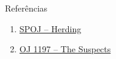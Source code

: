\begin{frame}[fragile]{Referências}

    \begin{enumerate}
        \item \href{https://www.spoj.com/problems/HERDING/}{SPOJ -- Herding}

        \item \href{https://onlinejudge.org/index.php?option=com_onlinejudge&Itemid=8&category=24&page=show_problem&problem=3638}{OJ 1197 -- The Suspects} 

    \end{enumerate}

\end{frame}
